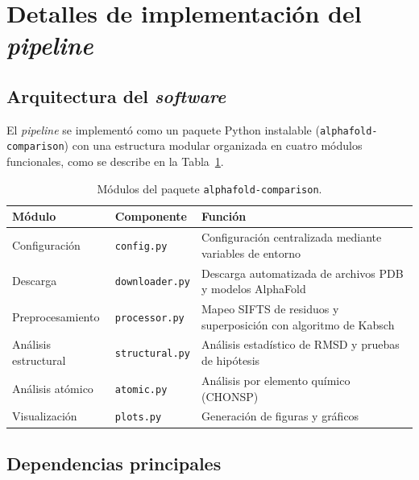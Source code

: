 
\appendix

\section{Detalles de implementaci\'on del \textit{pipeline}}
\label{appendix:pipeline}

\subsection{Arquitectura del \textit{software}}

El \textit{pipeline} se implement\'o como un paquete Python instalable
(\texttt{alphafold-comparison}) con una estructura modular organizada en
cuatro m\'odulos funcionales, como se describe en la Tabla~\ref{tab:modulos}.

\begin{table}[H]
\centering
\caption{M\'odulos del paquete \texttt{alphafold-comparison}.}
\label{tab:modulos}
\begin{tabular}{@{}llp{7cm}@{}}
\toprule
\textbf{M\'odulo} & \textbf{Componente} & \textbf{Funci\'on} \\
\midrule
Configuraci\'on & \texttt{config.py} & Configuraci\'on centralizada mediante variables de entorno \\
Descarga & \texttt{downloader.py} & Descarga automatizada de archivos PDB y modelos AlphaFold \\
Preprocesamiento & \texttt{processor.py} & Mapeo SIFTS de residuos y superposici\'on con algoritmo de Kabsch \\
An\'alisis estructural & \texttt{structural.py} & An\'alisis estad\'istico de RMSD y pruebas de hip\'otesis \\
An\'alisis at\'omico & \texttt{atomic.py} & An\'alisis por elemento qu\'imico (CHONSP) \\
Visualizaci\'on & \texttt{plots.py} & Generaci\'on de figuras y gr\'aficos \\
\bottomrule
\end{tabular}
\end{table}

\subsection{Dependencias principales}

